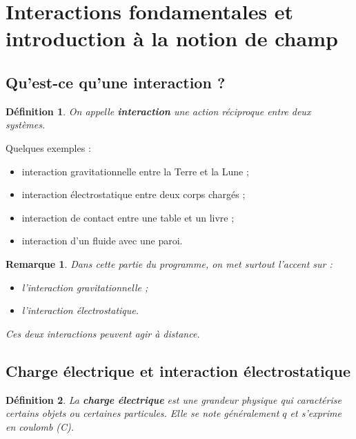 \documentclass[11pt,a4paper]{article}
\newtheorem{definition}{Définition}[section]
\newtheorem{remarque}{Remarque}[section]
\begin{document}
\section{Interactions fondamentales et introduction à la notion de champ}

\subsection{Qu'est-ce qu'une interaction ?}

\begin{definition}
On appelle \textbf{interaction} une action réciproque entre deux systèmes.
\end{definition}

Quelques exemples :
\begin{itemize}
    \item interaction gravitationnelle entre la Terre et la Lune ;
    \item interaction électrostatique entre deux corps chargés ;
    \item interaction de contact entre une table et un livre ;
    \item interaction d'un fluide avec une paroi.
\end{itemize}

\begin{remarque}
Dans cette partie du programme, on met surtout l'accent sur :
\begin{itemize}
    \item l'interaction gravitationnelle ;
    \item l'interaction électrostatique.
\end{itemize}
Ces deux interactions peuvent agir à distance.
\end{remarque}

\subsection{Charge électrique et interaction électrostatique}

\begin{definition}
La \textbf{charge électrique} est une grandeur physique qui caractérise certains objets ou certaines particules.
Elle se note généralement $q$ et s'exprime en coulomb (\si{C}).
\end{definition}
\end{document}
